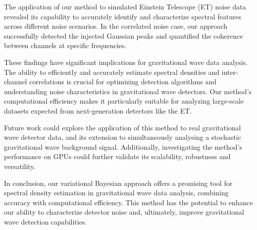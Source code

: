 \documentclass[%
 reprint,
 amsmath,amssymb,
 aps,
 nofootinbib,
]{revtex4-2}
\begin{document}
The application of our method to simulated Einstein Telescope (ET) noise data revealed its capability to accurately identify and characterize spectral features across different noise scenarios.
In the correlated noise case, our approach successfully detected the injected Gaussian peaks and quantified the coherence between channels at specific frequencies. 

These findings have significant implications for gravitational wave data analysis. 
The ability to efficiently and accurately estimate spectral densities and inter-channel correlations is crucial for optimizing detection algorithms and understanding noise characteristics in gravitational wave detectors. 
Our method's computational efficiency makes it particularly suitable for analyzing large-scale datasets expected from next-generation detectors like the ET.

Future work could explore the application of this method to real gravitational wave detector data, and its extension to simultaneously analysing a stochastic gravitational wave background signal. 
Additionally, investigating the method's performance on GPUs could further validate its scalability, robustness and versatility.

In conclusion, our variational Bayesian approach offers a promising tool for spectral density estimation in gravitational wave data analysis, combining accuracy with computational efficiency. 
This method has the potential to enhance our ability to characterize detector noise and, ultimately, improve gravitational wave detection capabilities.






\end{document}
